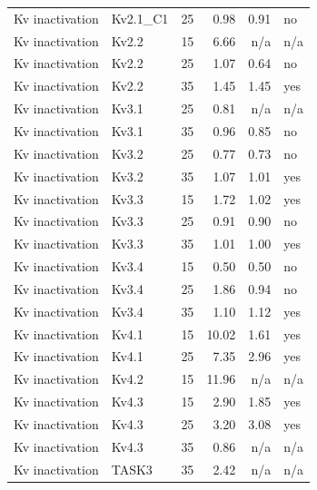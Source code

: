 \begin{longtable}{lllrrl}
Kv inactivation & Kv2.1\_C1 & 25 & 0.98 & 0.91 & no \\
Kv inactivation & Kv2.2 & 15 & 6.66 & n/a & n/a \\
Kv inactivation & Kv2.2 & 25 & 1.07 & 0.64 & no \\
Kv inactivation & Kv2.2 & 35 & 1.45 & 1.45 & yes \\
Kv inactivation & Kv3.1 & 25 & 0.81 & n/a & n/a \\
Kv inactivation & Kv3.1 & 35 & 0.96 & 0.85 & no \\
Kv inactivation & Kv3.2 & 25 & 0.77 & 0.73 & no \\
Kv inactivation & Kv3.2 & 35 & 1.07 & 1.01 & yes \\
Kv inactivation & Kv3.3 & 15 & 1.72 & 1.02 & yes \\
Kv inactivation & Kv3.3 & 25 & 0.91 & 0.90 & no \\
Kv inactivation & Kv3.3 & 35 & 1.01 & 1.00 & yes \\
Kv inactivation & Kv3.4 & 15 & 0.50 & 0.50 & no \\
Kv inactivation & Kv3.4 & 25 & 1.86 & 0.94 & no \\
Kv inactivation & Kv3.4 & 35 & 1.10 & 1.12 & yes \\
Kv inactivation & Kv4.1 & 15 & 10.02 & 1.61 & yes \\
Kv inactivation & Kv4.1 & 25 & 7.35 & 2.96 & yes \\
Kv inactivation & Kv4.2 & 15 & 11.96 & n/a & n/a \\
Kv inactivation & Kv4.3 & 15 & 2.90 & 1.85 & yes \\
Kv inactivation & Kv4.3 & 25 & 3.20 & 3.08 & yes \\
Kv inactivation & Kv4.3 & 35 & 0.86 & n/a & n/a \\
Kv inactivation & TASK3 & 35 & 2.42 & n/a & n/a \\
\end{longtable}
